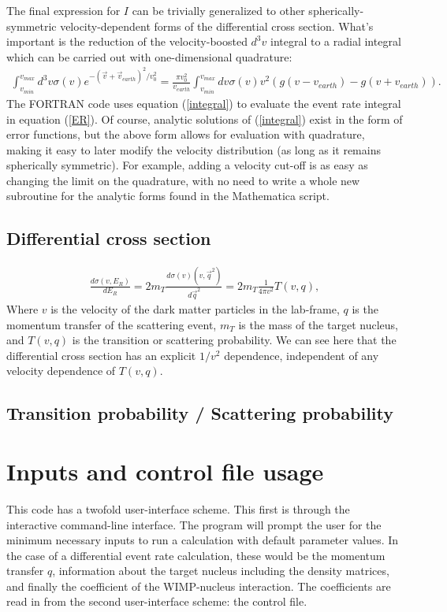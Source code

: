 \documentclass[11pt]{amsart}
\begin{document}
The final expression for $I$ can be trivially generalized to other spherically-symmetric velocity-dependent forms of the differential cross section. What's important is the reduction of the velocity-boosted $d^3v$ integral to a radial integral which can be carried out with one-dimensional quadrature:
\begin{equation}\label{integral}
\begin{split}
\int_{v_{min}}^{v_{max}} d^3v \sigma(v) e^{-(\vec{v}+\vec{v}_{earth})^2/v_0^2} 
	= \frac{\pi v_0^2}{v_{earth} }\int_{v_{min}}^{v_{max}} dv \sigma(v) v^2\left( g(v-v_{earth}) - g(v+v_{earth}) \right).
\end{split}
\end{equation}
The FORTRAN code uses equation (\ref{integral}) to evaluate the event rate integral in equation (\ref{ER}). Of course, analytic solutions of  (\ref{integral}) exist in the form of error functions, but the above form allows for evaluation with quadrature, making it easy to later modify the velocity distribution (as long as it remains spherically symmetric). For example, adding a velocity cut-off is as easy as changing the limit on the quadrature, with no need to write a whole new subroutine for the analytic forms found in the Mathematica script.

\subsection{Differential cross section}\label{crosssection}
\begin{equation}
\begin{split}
\frac{d\sigma(v,E_R)}{dE_R} = 2m_T \frac{d\sigma(v)(v,\vec{q}^2)}{d\vec{q}^2} = 2m_T\frac{1}{4\pi v^2}T(v,q),
\end{split}
\end{equation}
Where $v$ is the velocity of the dark matter particles in the lab-frame, $q$ is the momentum transfer of the scattering event, $m_T$ is the mass of the target nucleus, and $T(v,q)$ is the transition or scattering probability. We can see here that the differential cross section has an explicit $1/v^2$ dependence, independent of any velocity dependence of $T(v,q)$.


\subsection{Transition probability / Scattering probability}


\section{Inputs and control file usage}
This code has a twofold user-interface scheme. This first is through the interactive command-line interface. The program will prompt the user for the minimum necessary inputs to run a calculation with default parameter values. In the case of a differential event rate calculation, these would be the momentum transfer $q$, information about the target nucleus including the density matrices, and finally the coefficient of the WIMP-nucleus interaction. The coefficients are read in from the second user-interface scheme: the control file. 
\end{document}
